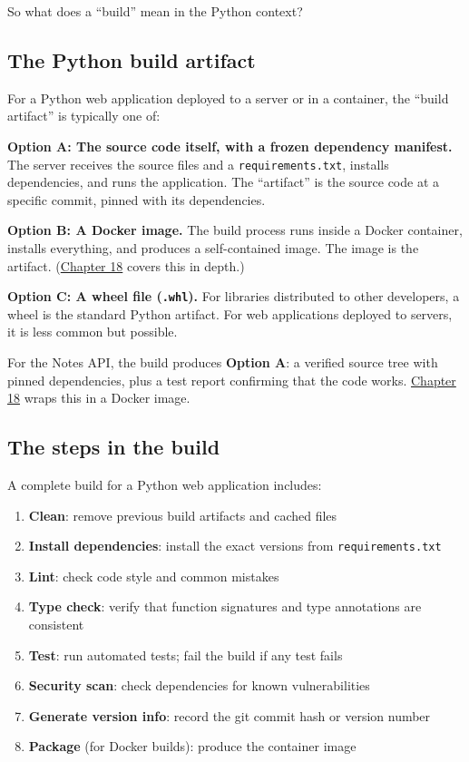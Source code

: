 So what does a ``build'' mean in the Python context?

\subsection*{The Python build artifact}\label{17-build-process:the-python-build-artifact}

For a Python web application deployed to a server or in a container, the ``build artifact'' is typically one of:

\textbf{Option A: The source code itself, with a frozen dependency manifest.} The server receives the source files and a \texttt{requirements.txt}, installs dependencies, and runs the application. The ``artifact'' is the source code at a specific commit, pinned with its dependencies.

\textbf{Option B: A Docker image.} The build process runs inside a Docker container, installs everything, and produces a self-contained image. The image is the artifact. (\hyperref[ch:18-containerization]{Chapter 18} covers this in depth.)

\textbf{Option C: A wheel file (\texttt{.whl}).} For libraries distributed to other developers, a wheel is the standard Python artifact. For web applications deployed to servers, it is less common but possible.

For the Notes API, the build produces \textbf{Option A}: a verified source tree with pinned dependencies, plus a test report confirming that the code works. \hyperref[ch:18-containerization]{Chapter 18} wraps this in a Docker image.

\subsection*{The steps in the build}\label{17-build-process:the-steps-in-the-build}

A complete build for a Python web application includes:

\begin{enumerate}
\def\labelenumi{\arabic{enumi}.}
\tightlist
\item
  \textbf{Clean}: remove previous build artifacts and cached files
\item
  \textbf{Install dependencies}: install the exact versions from \texttt{requirements.txt}
\item
  \textbf{Lint}: check code style and common mistakes
\item
  \textbf{Type check}: verify that function signatures and type annotations are consistent
\item
  \textbf{Test}: run automated tests; fail the build if any test fails
\item
  \textbf{Security scan}: check dependencies for known vulnerabilities
\item
  \textbf{Generate version info}: record the git commit hash or version number
\item
  \textbf{Package} (for Docker builds): produce the container image
\end{enumerate}

